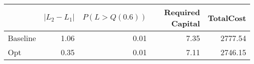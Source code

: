 \begin{tabular}{lrrrr}
\toprule
{} &  $|L_2 - L_1|$ &  $P(L > Q(0.6))$ &  Required Capital &  TotalCost \\
\midrule
Baseline &       1.06 &             0.01 &              7.35 &    2777.54 \\
Opt      &       0.35 &             0.01 &              7.11 &    2746.15 \\
\bottomrule
\end{tabular}

